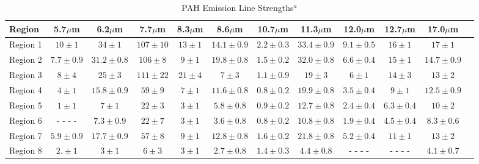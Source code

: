 \begin{table}
 \centering
 \begin{minipage}{200mm}
\caption{PAH Emission Line Strengths$^a$}
  \begin{tabular}{l c c  c  c  c  c  c  c  c  c c }
  \hline {Region  }&{5.7$\mu$m  }&{6.2$\mu$m  }&{7.7$\mu$m  }&{8.3$\mu$m  }&{8.6$\mu$m  }&{10.7$\mu$m  }&{11.3$\mu$m  }&{12.0$\mu$m  }&{12.7$\mu$m  }&{17.0$\mu$m  } 
   \\
 \hline
 Region 1 &$10\pm1$            & $34\pm1$        & $107\pm10$        & $13\pm1$       & $14.1\pm0.9$        & $2.2\pm0.3$        & $33.4\pm0.9$        & $9.1\pm0.5$        & $16\pm1$        & $17\pm1$        \\
Region 2 &$7.7\pm0.9$        & $31.2\pm0.8$        & $106\pm8$        & $9\pm1$           & $19.8\pm0.8$        & $1.5\pm0.2$        & $32.0\pm0.8$        & $6.6\pm0.4$        & $15\pm1$        & $14.7\pm0.9$        \\
Region 3 &$8\pm4$              & $25\pm3$                & $111\pm22$       &$21\pm4$       & $7\pm3$                 & $1.1\pm0.9$        & $19\pm3$             & $6\pm1$             & $14\pm3$           & $13\pm2$        \\
Region 4 &$4\pm1$              & $15.8\pm0.9$        & $59\pm9$        & $7\pm1$           & $11.6\pm0.8$          & $0.8\pm0.2$        & $19.9\pm0.8$        & $3.5\pm0.4$        & $9\pm1$             & $12.5\pm0.9$        \\
Region 5 &$1\pm1$              & $7\pm1$                 & $22\pm3$        & $3\pm1$           & $5.8\pm0.8$            & $0.9\pm0.2$        & $12.7\pm0.8$        & $2.4\pm0.4$        & $6.3\pm0.4$        & $10\pm2$        \\
Region 6 & - - - -                      &$ 7.3\pm0.9$         & $22\pm7$        & $3\pm1$            & $3.6\pm0.8$       & $0.8\pm0.2$        & $10.8\pm0.8$        & $1.9\pm0.4$        & $4.5\pm0.4$        & $8.3\pm0.6$        \\
Region 7 &$5.9\pm0.9$        & $17.7\pm0.9$       & $57\pm8$        & $9\pm1$            & $12.8\pm0.8$        & $1.6\pm0.2$        & $21.8\pm0.8$        & $5.2\pm0.4$        & $11\pm1$             & $13\pm2$        \\
Region 8 &$2.\pm1$              & $3\pm1$              & $6\pm3$            & $3\pm1$            & $2.7\pm0.8$        & $1.4\pm0.3$        & $4.4\pm0.8$            & - - - -                      &  - - - -               & $4.1\pm0.7$        \\

\end{tabular}
\end{minipage}
\end{table}
